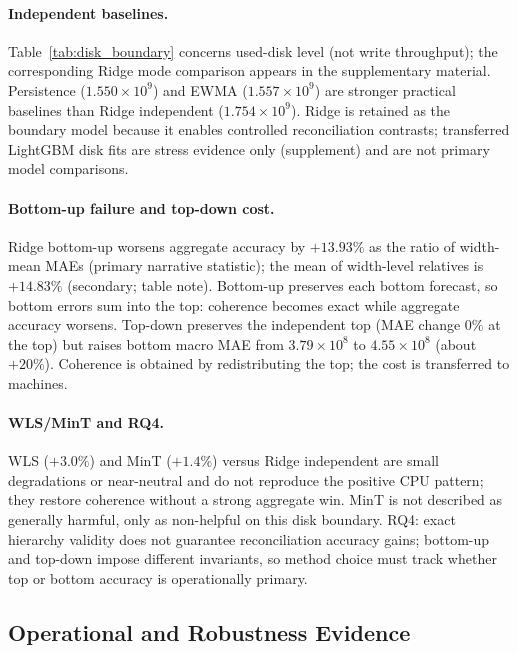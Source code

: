 \documentclass[a4paper,fleqn]{cas-dc}
\begin{document}
\paragraph{Independent baselines.}
Table~\ref{tab:disk_boundary} concerns used-disk level (not write throughput);
the corresponding Ridge mode comparison appears in the supplementary material.
Persistence ($1.550\times 10^9$) and {EWMA} ($1.557\times 10^9$) are stronger
practical baselines than Ridge independent ($1.754\times 10^9$).
Ridge is retained as the boundary model because it enables controlled
reconciliation contrasts; transferred LightGBM disk fits are stress evidence
only (supplement) and are not primary model comparisons.

\paragraph{Bottom-up failure and top-down cost.}
Ridge bottom-up worsens aggregate accuracy by $+13.93\%$ as the ratio of
width-mean {MAE}s (primary narrative statistic); the mean of width-level
relatives is $+14.83\%$ (secondary; table note).
Bottom-up preserves each bottom forecast, so bottom errors sum into the top:
coherence becomes exact while aggregate accuracy worsens.
Top-down preserves the independent top ({MAE} change $0\%$ at the top) but
raises bottom macro {MAE} from $3.79\times 10^8$ to $4.55\times 10^8$
(about $+20\%$).
Coherence is obtained by redistributing the top; the cost is transferred to
machines.

\paragraph{{WLS}/{MinT} and {RQ4}.}
{WLS} ($+3.0\%$) and MinT ($+1.4\%$) versus Ridge independent are small
degradations or near-neutral and do not reproduce the positive {CPU} pattern;
they restore coherence without a strong aggregate win.
MinT is not described as generally harmful, only as non-helpful on this disk
boundary.
{RQ4}: exact hierarchy validity does not guarantee reconciliation accuracy
gains; bottom-up and top-down impose different invariants, so method choice
must track whether top or bottom accuracy is operationally primary.



\subsection{Operational and Robustness Evidence}
\label{sec:ops}
\end{document}
